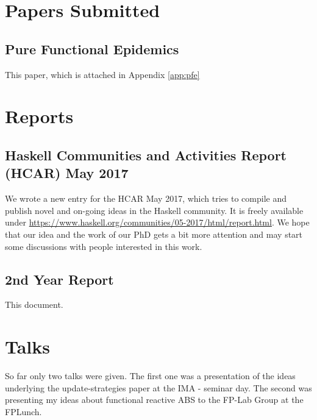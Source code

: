 \section{Papers Submitted}
\subsection{Pure Functional Epidemics}
This paper, which is attached in Appendix \ref{app:pfe}

\section{Reports}
\subsection{Haskell Communities and Activities Report (HCAR) May 2017}
We wrote a new entry for the HCAR May 2017, which tries to compile and publish novel and on-going ideas in the Haskell community. It is freely available under \url{https://www.haskell.org/communities/05-2017/html/report.html}. We hope that our idea and the work of our PhD gets a bit more attention and may start some discussions with people interested in this work.

\subsection{2nd Year Report}
This document.


\section{Talks}
So far only two talks were given. The first one was a presentation of the ideas underlying the update-strategies paper at the IMA - seminar day. The second was presenting my ideas about functional reactive ABS to the FP-Lab Group at the FPLunch.


